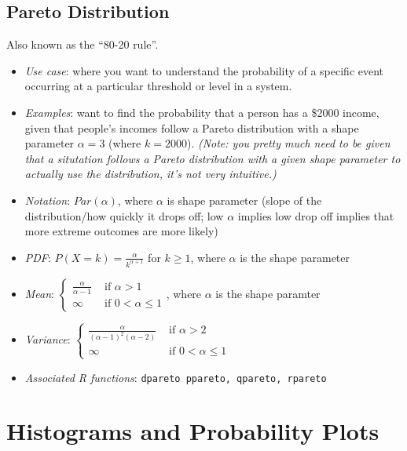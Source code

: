 \documentclass[12pt]{article}
\begin{document}
\subsection*{Pareto Distribution}

Also known as the ``80-20 rule''.

\begin{itemize}
	\item \textit{Use case}: where you want to understand the probability of a
	      specific event occurring at a particular threshold or level in a system.
	\item \textit{Examples}: want to find the probability that a person has
	      a \$2000 income, given that people's incomes follow a Pareto distribution
	      with a shape parameter $\alpha = 3$ (where $k = 2000$). \emph{(Note:
		      you pretty much need to be given that a situtation follows a Pareto
		      distribution with a given shape parameter to actually use the
		      distribution, it's not very intuitive.)}
	\item \textit{Notation}: $Par(\alpha)$, where $\alpha$ is shape
	      parameter (slope of the distribution/how quickly it drops off; low
	      $\alpha$ implies low drop off implies that more extreme outcomes are
	      more likely)
	\item \textit{PDF}: $P(X = k) = \frac{\alpha}{k^{\alpha + 1}}$ for $k
		      \geq 1$, where $\alpha$ is the shape parameter
	\item \textit{Mean}: $\begin{cases}
			      \frac{\alpha}{\alpha - 1} & \text{ if } \alpha > 1        \\
			      \infty                    & \text{ if } 0 < \alpha \leq 1
		      \end{cases}$, where $\alpha$ is the shape paramter
	\item \textit{Variance}: $\begin{cases}
			      \frac{\alpha}{(\alpha-1)^2(\alpha-2)} & \text{ if } \alpha > 2        \\
			      \infty                                & \text{ if } 0 < \alpha \leq 1
		      \end{cases}$
	\item \textit{Associated R functions}: \verb|dpareto ppareto, qpareto, rpareto|
\end{itemize}

\section*{Histograms and Probability Plots}
\end{document}

